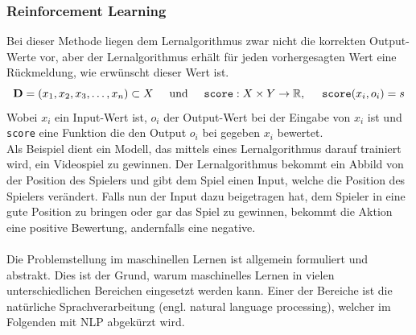 \documentclass[12pt,letterpaper,ngerman]{article}
\begin{document}
\subsubsection{Reinforcement Learning}
Bei dieser Methode liegen dem Lernalgorithmus zwar nicht die korrekten 
Output-Werte vor, aber der Lernalgorithmus erhält für jeden vorhergesagten Wert 
eine Rückmeldung, wie erwünscht dieser Wert ist. 
\[ 
  \mathbf{D} = (x_1, x_2, x_3, \dots, x_n) \subset X 
  \hspace{0.5cm}
  \text{und}
  \hspace{0.5cm}
  \texttt{score}: X \times Y \to \mathbb{R},
  \hspace{0.5cm}
  \texttt{score}(x_i, o_i) = s
\]
Wobei $x_i$ ein Input-Wert ist, $o_i$ der Output-Wert bei der 
Eingabe von $x_i$ ist und \texttt{score} eine Funktion die 
den Output $o_i$ bei gegeben $x_i$ bewertet.\\
Als Beispiel dient ein Modell,
das mittels eines Lernalgorithmus darauf trainiert wird, ein Videospiel zu 
gewinnen. Der Lernalgorithmus bekommt ein Abbild von der Position
des Spielers
und gibt dem Spiel einen Input, welche die Position des Spielers
verändert.
Falls nun der Input dazu 
beigetragen hat, dem Spieler in eine gute Position zu bringen
oder gar das Spiel zu
gewinnen, bekommt die Aktion eine positive Bewertung, 
andernfalls eine negative.\\\\
Die Problemstellung im maschinellen Lernen ist allgemein formuliert und abstrakt.
Dies ist der Grund, warum maschinelles Lernen in vielen unterschiedlichen 
Bereichen eingesetzt werden kann. Einer der Bereiche ist die natürliche
Sprachverarbeitung (engl. natural language processing),
welcher im Folgenden mit NLP abgekürzt wird.
\pagebreak
\end{document}
